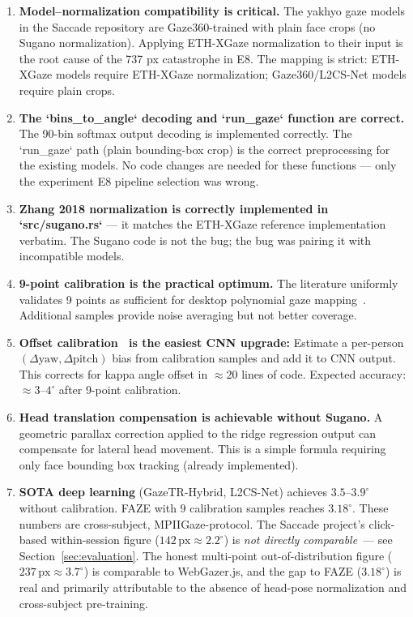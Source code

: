 \documentclass[11pt,a4paper]{article}
\begin{document}
\begin{enumerate}
  \item \textbf{Model--normalization compatibility is critical.}
  The yakhyo gaze models in the Saccade repository are Gaze360-trained with plain face crops (no Sugano normalization).
  Applying ETH-XGaze normalization to their input is the root cause of the 737 px catastrophe in E8.
  The mapping is strict: ETH-XGaze models require ETH-XGaze normalization; Gaze360/L2CS-Net models require plain crops.

  \item \textbf{The `bins\_to\_angle` decoding and `run\_gaze` function are correct.}
  The 90-bin softmax output decoding is implemented correctly.
  The `run\_gaze` path (plain bounding-box crop) is the correct preprocessing for the existing models.
  No code changes are needed for these functions --- only the experiment E8 pipeline selection was wrong.

  \item \textbf{Zhang 2018 normalization is correctly implemented in `src/sugano.rs`} ---
  it matches the ETH-XGaze reference implementation verbatim.
  The Sugano code is not the bug; the bug was pairing it with incompatible models.

  \item \textbf{9-point calibration is the practical optimum.}
  The literature uniformly validates 9 points as sufficient for desktop polynomial gaze mapping~\cite{cerrolaza2012polynomial,kar2017review}.
  Additional samples provide noise averaging but not better coverage.

  \item \textbf{Offset calibration~\cite{chen2020offset} is the easiest CNN upgrade:}
  Estimate a per-person $(\Delta\text{yaw}, \Delta\text{pitch})$ bias from calibration samples and add it to CNN output.
  This corrects for kappa angle offset in $\approx20$ lines of code.
  Expected accuracy: $\approx3$--$4^\circ$ after 9-point calibration.

  \item \textbf{Head translation compensation is achievable without Sugano.}
  A geometric parallax correction applied to the ridge regression output can compensate for lateral head movement.
  This is a simple formula requiring only face bounding box tracking (already implemented).

  \item \textbf{SOTA deep learning} (GazeTR-Hybrid, L2CS-Net) achieves $3.5$--$3.9^\circ$ without calibration.
  FAZE with 9 calibration samples reaches $3.18^\circ$.
  These numbers are cross-subject, MPIIGaze-protocol.
  The Saccade project's click-based within-session figure ($142\,\text{px} \approx 2.2^\circ$) is \textit{not directly comparable}~--- see Section~\ref{sec:evaluation}.
  The honest multi-point out-of-distribution figure ($237\,\text{px} \approx 3.7^\circ$) is comparable to WebGazer.js, and the gap to FAZE ($3.18^\circ$) is real and primarily attributable to the absence of head-pose normalization and cross-subject pre-training.


\end{enumerate}
\end{document}
